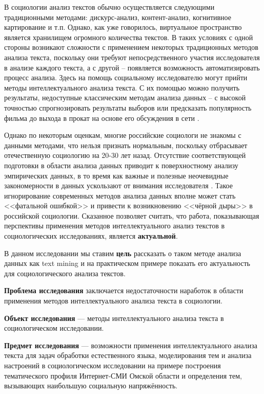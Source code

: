 В социологии анализ текстов обычно осуществляется следующими традиционными методами: дискурс-анализ, контент-анализ, когнитивное картирование и т.п. Однако, как уже говорилось, виртуальное пространство является хранилищем огромного количества текстов. В таких условиях с одной стороны возникают сложности с применением некоторых традиционных методов анализа текста, поскольку они требуют непосредственного участия исследователя в анализе каждого текста, а с другой -- появляется возможность автоматизировать процесс анализа. Здесь на помощь социальному исследователю могут прийти методы интеллектуального анализа текста. С их помощью можно получить результаты, недоступные классическим методам анализа данных -- с высокой точностью спрогнозировать результаты выборов \cite{venezuala} или предсказать популярность фильма до выхода в прокат на основе его обсуждения в сети \cite{hp_predicting}.

Однако по некоторым оценкам, многие российские социологи не знакомы с данными методами, что нельзя признать нормальным, поскольку отбрасывает отечественную социологию на 20-30 лет назад. Отсутствие соответствующей подготовки в области анализа данных приводит к поверхностному анализу эмпирических данных, в то время как важные и полезные неочевидные закономерности в данных ускользают от внимания исследователя \cite{Davydov_Knowledge}. Такое игнорирование современных методов анализа данных вполне может стать <<фатальной ошибкой>> \cite{Davidov_fatal} и привести к возникновению <<чёрной дыры>> \cite{black_hole} в российской социологии. Сказанное позволяет считать, что работа, показывающая перспективы применения методов интеллектуального анализ текстов в социологических исследованиях, является \textbf{актуальной}.

В данном исследовании мы ставим \textbf{цель} рассказать о таком методе анализа данных как text mining и на практическом примере показать его актуальность для социологического анализа текстов.

\textbf{Проблема исследования} заключается недостаточности наработок в области применения методов интеллектуального анализа текста в социологии.

\textbf{Объект исследования} --- методы интеллектуального анализа текста в социологическом исследовании.

\textbf{Предмет исследования} --- возможности применения интеллектуального анализа текста для задач обработки естественного языка, моделирования тем и анализа настроений в социологическом исследовании на примере построения тематического профиля Интернет-СМИ Омской области и определения тем, вызывающих наибольшую социальную напряжённость.

\clearpage